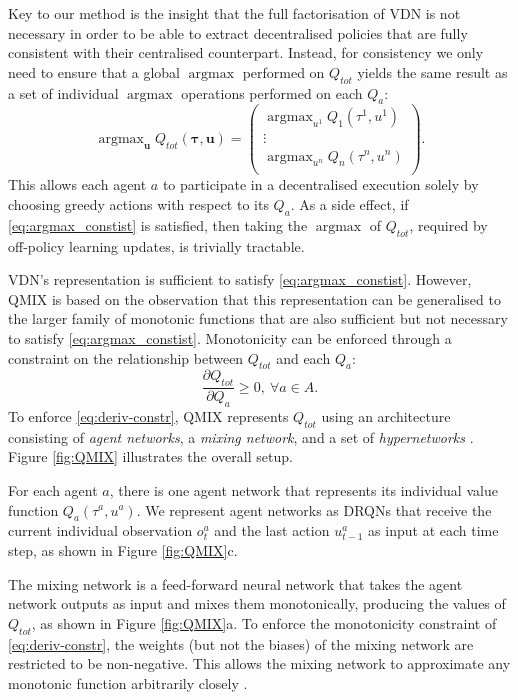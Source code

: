 \documentclass{article}
\DeclareMathOperator*{\argmax}{argmax}
\begin{document}
Key to our method is the insight that the full factorisation of VDN is not necessary in order to be able to extract decentralised policies that are fully consistent with their centralised counterpart. Instead, for consistency we only need to ensure that a global $\argmax$ performed on $Q_{tot}$ yields the same result as a set of individual $\argmax$ operations performed on each $Q_a$:
\begin{equation}
\label{eq:argmax_constist}
\argmax_{\mathbf{u}}Q_{tot}(\boldsymbol{\tau}, \mathbf{u}) = 
\begin{pmatrix}
\argmax_{u^1}Q_1(\tau^1, u^1)   \\
\vdots \\
\argmax_{u^n}Q_n(\tau^n, u^n) \\
\end{pmatrix}.
\end{equation}
This allows each agent $a$ to participate in a decentralised execution solely by choosing greedy actions with respect to its $ Q_a $. As a side effect, if \eqref{eq:argmax_constist} is satisfied, then taking the $\argmax$ of $Q_{tot}$, required by off-policy learning updates, is trivially tractable. 

VDN's representation is sufficient to satisfy \eqref{eq:argmax_constist}. However, QMIX is based on the observation that this representation can be generalised to the larger family of monotonic functions that are also sufficient but not necessary to satisfy \eqref{eq:argmax_constist}.   
Monotonicity can be enforced through a constraint on the relationship between $Q_{tot}$ and each $Q_a$:
\begin{equation}
\label{eq:deriv-constr}
\frac{\partial Q_{tot}}{\partial Q_a}  \geq 0,~ \forall a \in A.
\end{equation}
To enforce \eqref{eq:deriv-constr}, QMIX represents $Q_{tot}$ using an architecture consisting of \textit{agent networks}, a \textit{mixing network}, and a set of \emph{hypernetworks} \cite{ha_hypernetworks_2016}. Figure \ref{fig:QMIX} illustrates the overall setup. 

For each agent $a$, there is one agent network that represents its individual value function $Q_a (\tau^a, u^a)$. We represent agent networks as DRQNs that receive the current individual observation $o^a_t$ and the last action $u^a_{t-1}$ as input at each time step, as shown in Figure \ref{fig:QMIX}c. 

The mixing network is a feed-forward neural network that takes the agent network outputs as input and mixes them monotonically, producing the values of $Q_{tot}$, as shown in Figure \ref{fig:QMIX}a. To enforce the monotonicity constraint of \eqref{eq:deriv-constr}, the weights (but not the biases) of the mixing network are restricted to be non-negative. This allows the mixing network to approximate any monotonic function arbitrarily closely \citep{Dugas_2009}.
\end{document}
